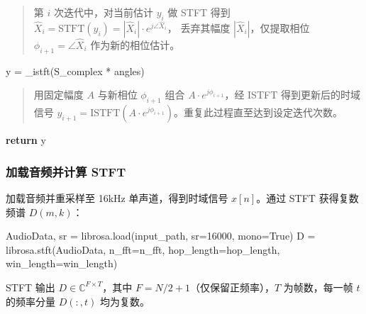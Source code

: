 \documentclass[
  english,
  letterpaper,
  DIV=11,
  numbers=noendperiod]{scrartcl}
\newenvironment{Shaded}{\begin{snugshade}}{\end{snugshade}}
\newcommand{\ControlFlowTok}[1]{\textcolor[rgb]{0.00,0.23,0.31}{\textbf{#1}}}
\newcommand{\DecValTok}[1]{\textcolor[rgb]{0.68,0.00,0.00}{#1}}
\newcommand{\NormalTok}[1]{\textcolor[rgb]{0.00,0.23,0.31}{#1}}
\newcommand{\OperatorTok}[1]{\textcolor[rgb]{0.37,0.37,0.37}{#1}}
\newcommand{\VariableTok}[1]{\textcolor[rgb]{0.07,0.07,0.07}{#1}}
\begin{document}
\begin{quote}
第 \(i\) 次迭代中，对当前估计 \(y_i\) 做 STFT 得到
\(\hat{X}_i = \text{STFT}(y_i) = |\hat{X}_i| \cdot e^{j\angle\hat{X}_i}\)，
丢弃其幅度 \(|\hat{X}_i|\)，仅提取相位 \(\phi_{i+1} = \angle\hat{X}_i\)
作为新的相位估计。
\end{quote}

\begin{Shaded}
\begin{Highlighting}[]
\NormalTok{        y }\OperatorTok{=}\NormalTok{ \_istft(S\_complex }\OperatorTok{*}\NormalTok{ angles)}
\end{Highlighting}
\end{Shaded}

\begin{quote}
用固定幅度 \(A\) 与新相位 \(\phi_{i+1}\) 组合
\(A \cdot e^{j\phi_{i+1}}\)，经 ISTFT 得到更新后的时域信号
\(y_{i+1} = \text{ISTFT}(A \cdot e^{j\phi_{i+1}})\)。重复此过程直至达到设定迭代次数。
\end{quote}

\begin{Shaded}
\begin{Highlighting}[]
    \ControlFlowTok{return}\NormalTok{ y}
\end{Highlighting}
\end{Shaded}

\subsubsection{加载音频并计算
STFT}\label{ux52a0ux8f7dux97f3ux9891ux5e76ux8ba1ux7b97-stft}

加载音频并重采样至 16kHz 单声道，得到时域信号 \(x[n]\)。通过 STFT
获得复数频谱 \(D(m,k)\)：

\begin{Shaded}
\begin{Highlighting}[]
\NormalTok{AudioData, sr }\OperatorTok{=}\NormalTok{ librosa.load(input\_path, sr}\OperatorTok{=}\DecValTok{16000}\NormalTok{, mono}\OperatorTok{=}\VariableTok{True}\NormalTok{)}
\NormalTok{D }\OperatorTok{=}\NormalTok{ librosa.stft(AudioData, n\_fft}\OperatorTok{=}\NormalTok{n\_fft,}
\NormalTok{                 hop\_length}\OperatorTok{=}\NormalTok{hop\_length, win\_length}\OperatorTok{=}\NormalTok{win\_length)}
\end{Highlighting}
\end{Shaded}

STFT 输出 \(D \in \mathbb{C}^{F \times T}\)，其中
\(F = N/2 + 1\)（仅保留正频率），\(T\) 为帧数，每一帧 \(t\) 的频率分量
\(D(:,t)\) 均为复数。
\end{document}
